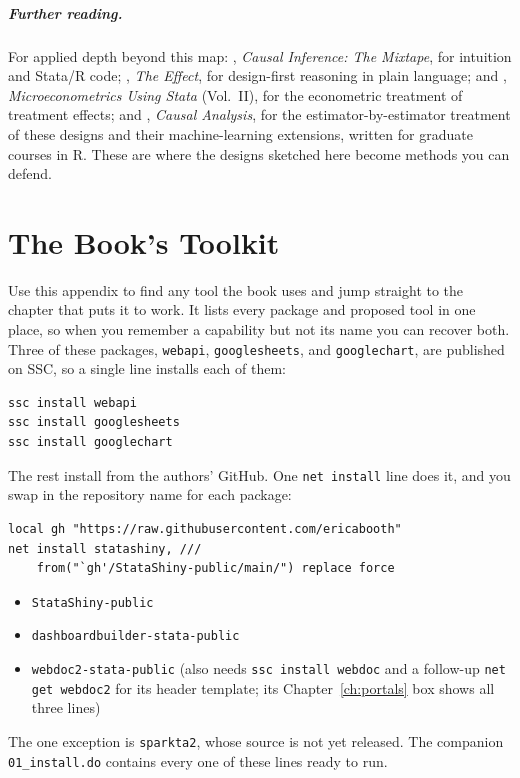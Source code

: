 \documentclass[
    a4paper,
    fontsize=10pt,
    twoside=true,
    numbers=noenddot,
]{kaobook}
\begin{document}
\paragraph{Further reading.} For applied depth beyond this map: \textcite{cunningham2021mixtape}, \emph{Causal Inference: The Mixtape}, for intuition and Stata/R code; \textcite{huntingtonklein2022effect}, \emph{The Effect}, for design-first reasoning in plain language; and \textcite{cameron2022microeconometrics}, \emph{Microeconometrics Using Stata} (Vol.~II), for the econometric treatment of treatment effects; and \textcite{huber2023causal}, \emph{Causal Analysis}, for the estimator-by-estimator treatment of these designs and their machine-learning extensions, written for graduate courses in R. These are where the designs sketched here become methods you can defend.

\chapter{The Book's Toolkit}\label{app:toolkit}
Use this appendix to find any tool the book uses and jump straight to the chapter that puts it to work. It lists every package and proposed tool in one place, so when you remember a capability but not its name you can recover both. Three of these packages, \texttt{webapi}, \texttt{googlesheets}, and \texttt{googlechart}, are published on SSC, so a single line installs each of them:
\par
{\footnotesize
\begin{verbatim}
ssc install webapi
ssc install googlesheets
ssc install googlechart
\end{verbatim}
}
The rest install from the authors' GitHub. One \texttt{net install} line does it, and you swap in the repository name for each package:
\par
{\footnotesize
\begin{verbatim}
local gh "https://raw.githubusercontent.com/ericabooth"
net install statashiny, ///
    from("`gh'/StataShiny-public/main/") replace force
\end{verbatim}
}
\begin{itemize}
    \item \texttt{StataShiny-public}
    \item \texttt{dashboardbuilder-stata-public}
    \item \texttt{webdoc2-stata-public} (also needs \texttt{ssc install webdoc} and a follow-up \texttt{net get webdoc2} for its header template; its Chapter~\ref{ch:portals} box shows all three lines)
\end{itemize}
The one exception is \texttt{sparkta2}, whose source is not yet released. The companion \texttt{01\_install.do} contains every one of these lines ready to run.
\end{document}
